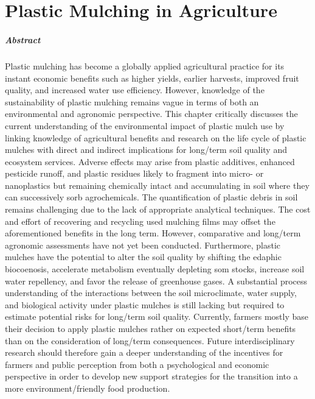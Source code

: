 
\chapter{Plastic Mulching in Agriculture}
\label{ch:plastic-mulching}

\paragraph{Abstract} Plastic mulching has become a globally applied agricultural practice for its instant economic benefits such as higher yields, earlier harvests, improved fruit quality, and increased water use efficiency. However, knowledge of the sustainability of plastic mulching remains vague in terms of both an environmental and agronomic perspective. This chapter critically discusses the current understanding of the environmental impact of plastic mulch use by linking knowledge of agricultural benefits and research on the life cycle of plastic mulches with direct and indirect implications for long\-/term soil quality and ecosystem services. Adverse effects may arise from plastic additives, enhanced pesticide runoff, and plastic residues likely to fragment into micro- or nanoplastics but remaining chemically intact and accumulating in soil where they can successively sorb agrochemicals. The quantification of plastic debris in soil remains challenging due to the lack of appropriate analytical techniques. The cost and effort of recovering and recycling used mulching films may offset the aforementioned benefits in the long term. However, comparative and long\-/term agronomic assessments have not yet been conducted. Furthermore, plastic mulches have the potential to alter the soil quality by shifting the edaphic biocoenosis, accelerate  metabolism eventually depleting \ac{som} stocks, increase soil water repellency, and favor the release of greenhouse gases. A substantial process understanding of the interactions between the soil microclimate, water supply, and biological activity under plastic mulches is still lacking but required to estimate potential risks for long\-/term soil quality. Currently, farmers mostly base their decision to apply plastic mulches rather on expected short\-/term benefits than on the consideration of long\-/term consequences. Future interdisciplinary research should therefore gain a deeper understanding of the incentives for farmers and public perception from both a psychological and economic perspective in order to develop new support strategies for the transition into a more environment\-/friendly food production.


